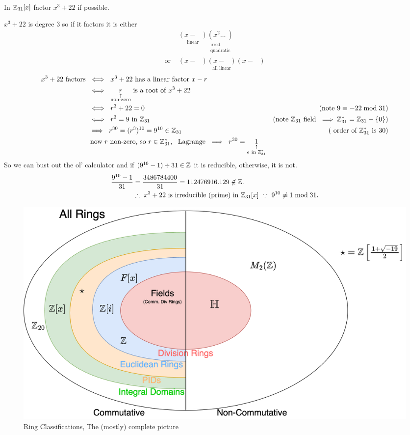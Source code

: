 \begin{example}
    In ${\mathbb{ Z}}_{31}[x]$ factor $x^3+22$ if possible. \\ \steezybreak

    $x^3+22$ is degree $3$ so if it factors it is either 
    \begin{align*}
        &\underset{\text{linear}}{(x - \ \ \ )}\underset{\substack{\text{irred.} \\ \text{quadratic}}}{(x^2 \dots \ )} \\
        \text{or } & \underset{\text{all linear}}{(x-\ \ \ )(x- \ \ \ )(x- \ \ \ )}
    \end{align*}
    \begin{align*}
        x^3+22 \text{ factors } &\iff \ x^3+22 \text{ has a linear factor }x-r  & \\
        &\iff \ \underset{\substack{\uparrow \\ \text{non-zero}}}{r} \text{ is a root of }x^3+22 & \\
        &\iff \ r^3+22=0  &(\text{note }9\equiv -22 \mod 31) \\
        &\iff \ r^3 = 9 \text{ in }\Z_{31}   &(\text{note }\Z_{31}\text{ field }\implies \Z_{31}^*=\Z_{31}-\{0\})\\
        &\implies \ r^{30} = (r^3)^{10} = 9^{10} \in \Z_{31} &(\text{ order of }\Z_{31}^* \text{ is } 30) \\
        &\text{ now }r \text{ non-zero, so }r\in \Z_{31}^*, \ \ \text{Lagrange }\implies \ r^{30}=\underset{\substack{\uparrow \\ e  \text{ in }\Z_{31}^*}}{1} 
    \end{align*}
    So we can bust out the ol' calculator and if $(9^{10}-1)\div 31 \in {\mathbb{ Z}}$ it is reducible, otherwise, it is not.
    \begin{align*}
        \frac{9^{10}-1}{31} &= \frac{3486784400}{31} = 112476916.129 \not \in {\mathbb{ Z}}. \\
        &\therefore \ x^3+22 \text{ is irreducible (prime) in }{\mathbb{ Z}}_{31}[x] \ \because \ 9^{10}\not\equiv 1 \bmod 31.
    \end{align*}
\end{example}
\newpage
\begin{figure}
\begin{center}
        \includegraphics[width=\textwidth]{Figures/Ring Classifications_PID_not_Euc.png}
        \caption{Ring Classifications, The (mostly) complete picture}
\end{center}
\end{figure}

